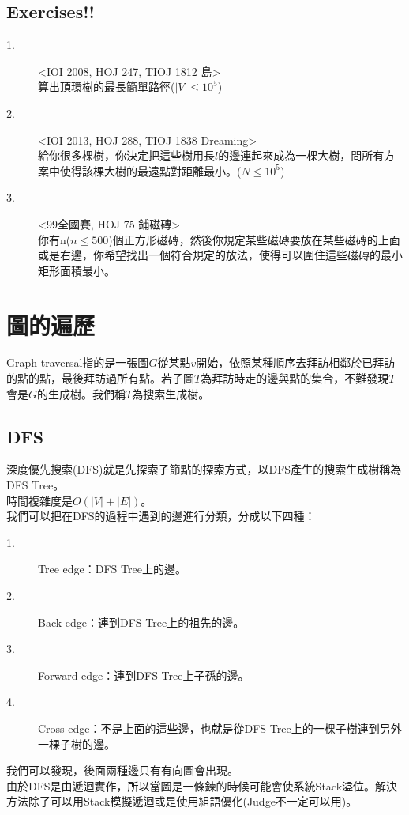 \documentclass{article}
\begin{document}
\subsection{Exercises!!}
\begin{description}
\item[ 1.]<IOI 2008, HOJ 247, TIOJ 1812 島>\\
算出頂環樹的最長簡單路徑($|V| \leq 10^5$)
\item[ 2.]<IOI 2013, HOJ 288, TIOJ 1838 Dreaming>\\
給你很多棵樹，你決定把這些樹用長$l$的邊連起來成為一棵大樹，問所有方案中使得該棵大樹的最遠點對距離最小。($N \leq 10^5$)
\item[ 3.]<99全國賽, HOJ 75 鋪磁磚>\\
你有n($n \leq 500$)個正方形磁磚，然後你規定某些磁磚要放在某些磁磚的上面或是右邊，你希望找出一個符合規定的放法，使得可以圍住這些磁磚的最小矩形面積最小。
\end{description}


\section{圖的遍歷}
Graph traversal指的是一張圖$G$從某點$v$開始，依照某種順序去拜訪相鄰於已拜訪的點的點，最後拜訪過所有點。若子圖$T$為拜訪時走的邊與點的集合，不難發現$T$會是$G$的生成樹。我們稱$T$為搜索生成樹。

\subsection{DFS}
深度優先搜索(DFS)就是先探索子節點的探索方式，以DFS產生的搜索生成樹稱為DFS Tree。\\
時間複雜度是$O(|V|+|E|)$。\\
我們可以把在DFS的過程中遇到的邊進行分類，分成以下四種：
\begin{description}
\item[ 1.]Tree edge：DFS Tree上的邊。
\item[ 2.]Back edge：連到DFS Tree上的祖先的邊。
\item[ 3.]Forward edge：連到DFS Tree上子孫的邊。
\item[ 4.]Cross edge：不是上面的這些邊，也就是從DFS Tree上的一棵子樹連到另外一棵子樹的邊。
\end{description}
我們可以發現，後面兩種邊只有有向圖會出現。\\[2em]
由於DFS是由遞迴實作，所以當圖是一條鍊的時候可能會使系統Stack溢位。解決方法除了可以用Stack模擬遞迴或是使用組語優化(Judge不一定可以用)。
\end{document}
